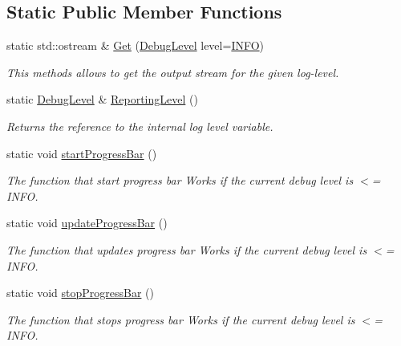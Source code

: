 \subsection*{Static Public Member Functions}
\begin{DoxyCompactItemize}
\item 
static std\+::ostream \& \hyperlink{class_logger_ae2b3102712f501c8a87306b242c6e85f}{Get} (\hyperlink{class_logger_a96ecc57d01700c7b14d101f0f65a9932}{Debug\+Level} level=\hyperlink{class_logger_a96ecc57d01700c7b14d101f0f65a9932a61a9b6fc1e9babc448984b8a34ca2ed2}{I\+N\+F\+O})
\begin{DoxyCompactList}\small\item\em This methods allows to get the output stream for the given log-\/level. \end{DoxyCompactList}\item 
static \hyperlink{class_logger_a96ecc57d01700c7b14d101f0f65a9932}{Debug\+Level} \& \hyperlink{class_logger_a8b07a26d2b5896a239e3b834ff4e9024}{Reporting\+Level} ()
\begin{DoxyCompactList}\small\item\em Returns the reference to the internal log level variable. \end{DoxyCompactList}\item 
static void \hyperlink{class_logger_aa0bf3fb521a27a3d343c4f16523e3669}{start\+Progress\+Bar} ()
\begin{DoxyCompactList}\small\item\em The function that start progress bar Works if the current debug level is $<$= I\+N\+F\+O. \end{DoxyCompactList}\item 
static void \hyperlink{class_logger_a2b95916da99c2f3298bafabc61340262}{update\+Progress\+Bar} ()
\begin{DoxyCompactList}\small\item\em The function that updates progress bar Works if the current debug level is $<$= I\+N\+F\+O. \end{DoxyCompactList}\item 
static void \hyperlink{class_logger_a684c36c7810276214a0b3592ee907baf}{stop\+Progress\+Bar} ()
\begin{DoxyCompactList}\small\item\em The function that stops progress bar Works if the current debug level is $<$= I\+N\+F\+O. \end{DoxyCompactList}\end{DoxyCompactItemize}
